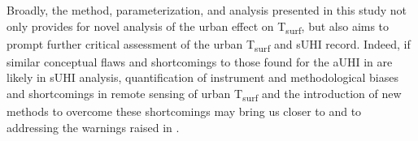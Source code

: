 \begin{bibunit}
Broadly, the method, parameterization, and analysis presented in this study not only provides for novel analysis of the urban effect on T\textsubscript{surf}, but also aims to prompt further critical assessment of the urban T\textsubscript{surf} and sUHI record. Indeed, if similar conceptual flaws and shortcomings to those found for the aUHI in \citet{Stewart2011} are likely in sUHI analysis, quantification of instrument and methodological biases and shortcomings in remote sensing of urban T\textsubscript{surf} and the introduction of new methods to overcome these shortcomings may bring us closer to and to addressing the warnings raised in \citet{Stewart2011}.

\cleardoublepage 
{}  
\renewcommand*{\bibname}{References}


\putbib
\end{bibunit}